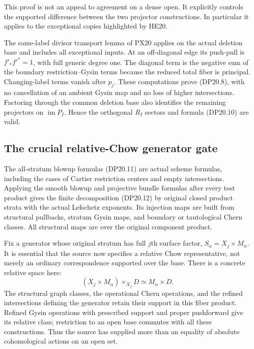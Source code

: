 This proof is not an appeal to agreement on a dense open.
It explicitly controls the supported difference between the
two projector constructions. In particular it applies to the
exceptional copies highlighted by HE20.

The same-label divisor transport lemma of PX20 applies on the
actual deletion base and includes all exceptional inputs. At
an off-diagonal edge its push-pull is $f'_*f'^*=1$, with full
generic degree one. The diagonal term is the negative sum of
the boundary restriction--Gysin terms because the reduced total
fiber is principal. Changing-label terms vanish after $p_j$.
These computations prove (DP20.8), with no cancellation of an
ambient Gysin map and no loss of higher intersections. Factoring
through the common deletion base also identifies the remaining
projectors on $\operatorname{im}P_I$. Hence the orthogonal
$R_I$ sectors and formula (DP20.10) are valid.

\subsection{The crucial relative-Chow generator gate}

The all-stratum blowup formulas (DP20.11) are actual scheme
formulas, including the cases of Cartier restriction centers and
empty intersections. Applying the smooth blowup and projective
bundle formulas after every test product gives the finite
decomposition (DP20.12) by original closed product strata with
the actual Lefschetz exponents. Its injection maps are built
from structural pullbacks, stratum Gysin maps, and boundary or
tautological Chern classes. All structural maps are over the
original component product.

Fix a generator whose original stratum has full $j$th surface
factor, $S_\alpha=X_j\times M_\alpha$. It is essential that
the source now specifies a relative Chow representative, not
merely an ordinary correspondence supported over the base.
There is a concrete relative space here:
\[
 (X_j\times M_\alpha)\times_{X_j}D
                  \simeq M_\alpha\times D.
\]
The structural graph classes, the operational Chern operations,
and the refined intersections defining the generator retain
their support in this fiber product. Refined Gysin operations
with prescribed support and proper pushforward give its
relative class; restriction to an open base commutes with all
these constructions. Thus the source has supplied more than an
equality of absolute cohomological actions on an open set.

